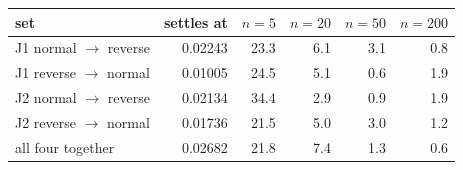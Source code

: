 \begin{tabular}{lrrrrr}
\toprule
set & settles at & $n{=}5$ & $n{=}20$ & $n{=}50$ & $n{=}200$ \\
\midrule
J1 normal $\to$ reverse & 0.02243 & 23.3 & 6.1 & 3.1 & 0.8 \\
J1 reverse $\to$ normal & 0.01005 & 24.5 & 5.1 & 0.6 & 1.9 \\
J2 normal $\to$ reverse & 0.02134 & 34.4 & 2.9 & 0.9 & 1.9 \\
J2 reverse $\to$ normal & 0.01736 & 21.5 & 5.0 & 3.0 & 1.2 \\
all four together & 0.02682 & 21.8 & 7.4 & 1.3 & 0.6 \\
\bottomrule
\end{tabular}
